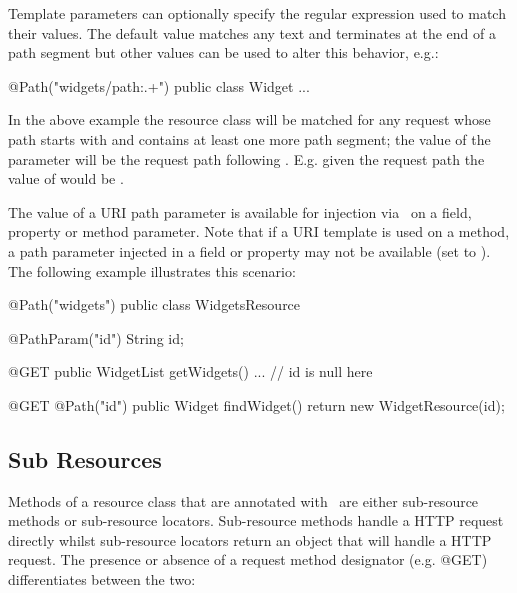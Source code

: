 Template parameters can optionally specify the regular expression used to match their values. The default value matches any text and terminates at the end of a path segment but other values can be used to alter this behavior, e.g.:

\begin{listing}{1}
@Path("widgets/{path:.+}")
public class Widget {
  ...
}\end{listing}

In the above example the  resource class will be matched for any request whose path starts with  and contains at least one more path segment; the value of the  parameter will be the request path following . E.g. given the request path  the value of  would be .

The value of a URI path parameter is available for injection via \PathParam\ on a field, property or method parameter. Note that if a URI template is used on a method, a path parameter injected in a field or property may not be available (set to ). The following example illustrates this scenario:

\begin{listing}{1}
@Path("widgets")
public class WidgetsResource {
  @PathParam("id") String id;
  
  @GET
  public WidgetList getWidgets() {
    ...     // id is null here
  }
  
  @GET
  @Path("{id}")
  public Widget findWidget() {
    return new WidgetResource(id);
  }
}\end{listing}

\subsection{Sub Resources}
\label{sub_resources}

Methods of a resource class that are annotated with \Path\ are either sub-resource methods or sub-resource locators. Sub-resource methods handle a HTTP request directly whilst sub-resource locators return an object that will handle a HTTP request. The presence or absence of a request method designator (e.g. @GET) differentiates between the two:

